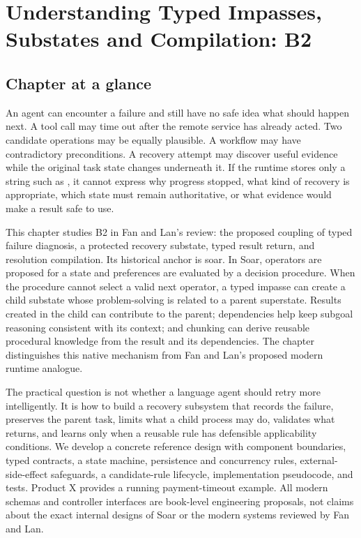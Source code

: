 \chapter{Understanding Typed Impasses, Substates and Compilation: B2}
\label{ch:typed-impasses-substates-compilation}

\section*{Chapter at a glance}
{}

An agent can encounter a failure and still have no safe idea what should happen next. A tool call may time out after the remote service has already acted. Two candidate operations may be equally plausible. A workflow may have contradictory preconditions. A recovery attempt may discover useful evidence while the original task state changes underneath it. If the runtime stores only a string such as , it cannot express why progress stopped, what kind of recovery is appropriate, which state must remain authoritative, or what evidence would make a result safe to use.

This chapter studies B2 in Fan and Lan's review: the proposed coupling of typed failure diagnosis, a protected recovery substate, typed result return, and resolution compilation. Its historical anchor is \gls{soar}. In Soar, operators are proposed for a state and preferences are evaluated by a decision procedure. When the procedure cannot select a valid next operator, a typed \gls{impasse} can create a child substate whose problem-solving is related to a parent superstate. Results created in the child can contribute to the parent; dependencies help keep subgoal reasoning consistent with its context; and chunking can derive reusable procedural knowledge from the result and its dependencies. The chapter distinguishes this native mechanism from Fan and Lan's proposed modern runtime analogue.

The practical question is not whether a language agent should retry more intelligently. It is how to build a recovery subsystem that records the failure, preserves the parent task, limits what a child process may do, validates what returns, and learns only when a reusable rule has defensible applicability conditions. We develop a concrete reference design with component boundaries, typed contracts, a state machine, persistence and concurrency rules, external-side-effect safeguards, a candidate-rule lifecycle, implementation pseudocode, and tests. Product X provides a running payment-timeout example. All modern schemas and controller interfaces are book-level engineering proposals, not claims about the exact internal designs of Soar or the modern systems reviewed by Fan and Lan.

